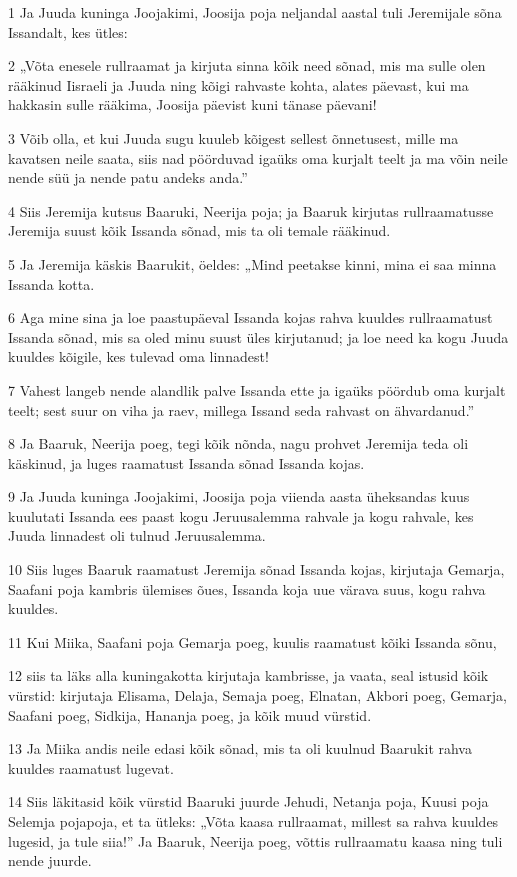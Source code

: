 \par 1 Ja Juuda kuninga Joojakimi, Joosija poja neljandal aastal tuli Jeremijale sõna Issandalt, kes ütles:
\par 2 „Võta enesele rullraamat ja kirjuta sinna kõik need sõnad, mis ma sulle olen rääkinud Iisraeli ja Juuda ning kõigi rahvaste kohta, alates päevast, kui ma hakkasin sulle rääkima, Joosija päevist kuni tänase päevani!
\par 3 Võib olla, et kui Juuda sugu kuuleb kõigest sellest õnnetusest, mille ma kavatsen neile saata, siis nad pöörduvad igaüks oma kurjalt teelt ja ma võin neile nende süü ja nende patu andeks anda.”
\par 4 Siis Jeremija kutsus Baaruki, Neerija poja; ja Baaruk kirjutas rullraamatusse Jeremija suust kõik Issanda sõnad, mis ta oli temale rääkinud.
\par 5 Ja Jeremija käskis Baarukit, öeldes: „Mind peetakse kinni, mina ei saa minna Issanda kotta.
\par 6 Aga mine sina ja loe paastupäeval Issanda kojas rahva kuuldes rullraamatust Issanda sõnad, mis sa oled minu suust üles kirjutanud; ja loe need ka kogu Juuda kuuldes kõigile, kes tulevad oma linnadest!
\par 7 Vahest langeb nende alandlik palve Issanda ette ja igaüks pöördub oma kurjalt teelt; sest suur on viha ja raev, millega Issand seda rahvast on ähvardanud.”
\par 8 Ja Baaruk, Neerija poeg, tegi kõik nõnda, nagu prohvet Jeremija teda oli käskinud, ja luges raamatust Issanda sõnad Issanda kojas.
\par 9 Ja Juuda kuninga Joojakimi, Joosija poja viienda aasta üheksandas kuus kuulutati Issanda ees paast kogu Jeruusalemma rahvale ja kogu rahvale, kes Juuda linnadest oli tulnud Jeruusalemma.
\par 10 Siis luges Baaruk raamatust Jeremija sõnad Issanda kojas, kirjutaja Gemarja, Saafani poja kambris ülemises õues, Issanda koja uue värava suus, kogu rahva kuuldes.
\par 11 Kui Miika, Saafani poja Gemarja poeg, kuulis raamatust kõiki Issanda sõnu,
\par 12 siis ta läks alla kuningakotta kirjutaja kambrisse, ja vaata, seal istusid kõik vürstid: kirjutaja Elisama, Delaja, Semaja poeg, Elnatan, Akbori poeg, Gemarja, Saafani poeg, Sidkija, Hananja poeg, ja kõik muud vürstid.
\par 13 Ja Miika andis neile edasi kõik sõnad, mis ta oli kuulnud Baarukit rahva kuuldes raamatust lugevat.
\par 14 Siis läkitasid kõik vürstid Baaruki juurde Jehudi, Netanja poja, Kuusi poja Selemja pojapoja, et ta ütleks: „Võta kaasa rullraamat, millest sa rahva kuuldes lugesid, ja tule siia!” Ja Baaruk, Neerija poeg, võttis rullraamatu kaasa ning tuli nende juurde.

